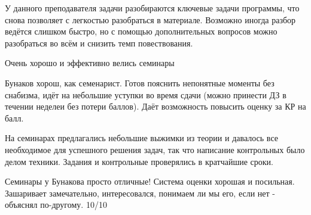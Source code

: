             \begin{commentbox} 
                У данного преподавателя задачи разобираются ключевые задачи программы, что снова позволяет с легкостью разобраться в материале. Возможно иногда разбор ведётся слишком быстро, но с помощью дополнительных вопросов можно разобраться во всём и снизить темп повествования. 
            \end{commentbox} 
        
            \begin{commentbox} 
                Очень хорошо и эффективно велись семинары 
            \end{commentbox} 
        
            \begin{commentbox} 
                Бунаков хорош, как семенарист. Готов пояснить непонятные моменты без снабизма, идёт на небольшие уступки во время сдачи (можно принести ДЗ в течении неделеи без потери баллов). Даёт возможность повысить оценку за КР на балл.  
            \end{commentbox} 
        
            \begin{commentbox} 
                На семинарах предлагались небольшие выжимки из теории и давалось все необходимое для успешного решения задач, так что написание контрольных было делом техники. Задания и контрольные проверялись в кратчайшие сроки. 
            \end{commentbox} 
        
            \begin{commentbox} 
                Семинары у Бунакова просто отличные! Система оценки хорошая и посильная. Зашаривает замечательно, интересовался, понимаем ли мы его, если нет - объяснял по-другому. 10/10 
            \end{commentbox} 


